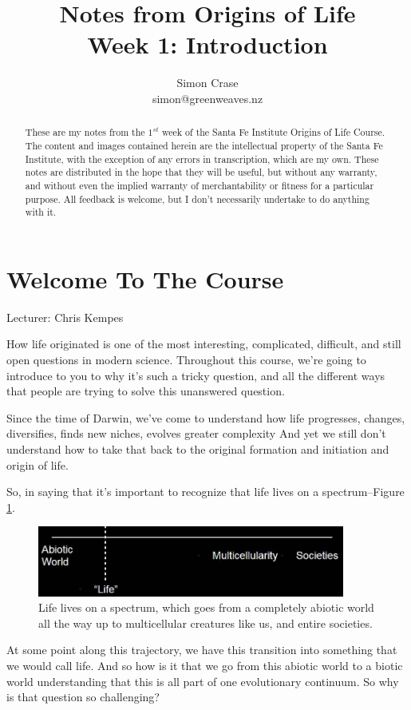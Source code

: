 \documentclass[]{article}
\title{
	Notes from Origins of Life\\
	Week 1: Introduction
}
\author{Simon Crase\\simon@greenweaves.nz}
\begin{document}
\maketitle

\begin{abstract}
    These are my notes from the $1^{st}$ week of the Santa Fe Institute Origins of Life Course\cite{sfi2019}.\\
    The content and images contained herein are the intellectual property of the Santa Fe Institute, with the exception of any errors in transcription, which are my own.
    These notes are distributed in the hope that they will be useful,
    but without any warranty, and without even the implied warranty of
     merchantability or fitness for a particular purpose. All feedback is welcome,
    but I don't necessarily undertake to do anything with it.
\end{abstract}

\setcounter{tocdepth}{2}
\tableofcontents
\listoffigures

\section{Welcome To The Course}

Lecturer: Chris Kempes

How life originated is one of the most interesting, complicated, difficult, and still open questions in modern science. Throughout this course, we're going to
introduce to you to why it's such a tricky question, and all the different ways that people are trying to solve this unanswered question.	

Since the time of Darwin, we've come to understand how life
progresses, changes, diversifies, finds new niches, evolves greater complexity
And yet we still don't understand how to take that back to
the original formation and initiation and origin of life.


So, in saying that it's important to recognize that life lives on a spectrum--Figure \ref{fig:lifesTransitions}.

\begin{figure}[H]
	\caption[Life lives on a spectrum]{Life lives on a spectrum, which goes from a completely abiotic world
		all the way up to multicellular creatures like us, and entire societies.}\label{fig:lifesTransitions}
	\includegraphics[width=0.9\textwidth]{lifesTransitions}
\end{figure}
At some point along this trajectory, we have this transition into something
that we would call life. And so how is it that we go from this
abiotic world to a biotic world understanding that this is all part of one
evolutionary continuum. So why is that question so challenging?
\end{document}
